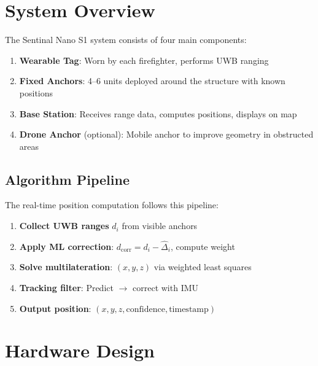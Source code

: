 \documentclass[11pt,a4paper]{article}
\begin{document}
\section{System Overview}

The Sentinal Nano S1 system consists of four main components:

\begin{enumerate}
    \item \textbf{Wearable Tag}: Worn by each firefighter, performs UWB ranging
    \item \textbf{Fixed Anchors}: 4--6 units deployed around the structure with known positions
    \item \textbf{Base Station}: Receives range data, computes positions, displays on map
    \item \textbf{Drone Anchor} (optional): Mobile anchor to improve geometry in obstructed areas
\end{enumerate}

\subsection{Algorithm Pipeline}

The real-time position computation follows this pipeline:

\begin{enumerate}
    \item \textbf{Collect UWB ranges} $d_i$ from visible anchors
    \item \textbf{Apply ML correction}: $d_{\text{corr}} = d_i - \hat{\Delta}_i$, compute weight
    \item \textbf{Solve multilateration}: $(x, y, z)$ via weighted least squares
    \item \textbf{Tracking filter}: Predict $\rightarrow$ correct with IMU
    \item \textbf{Output position}: $(x, y, z, \text{confidence}, \text{timestamp})$
\end{enumerate}

\section{Hardware Design}
\end{document}
